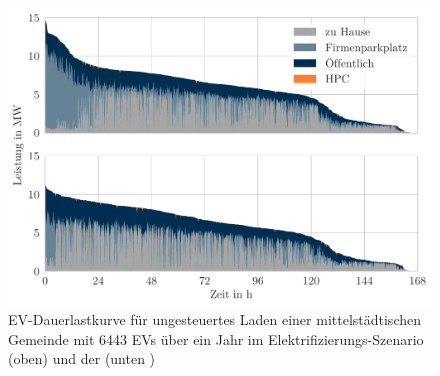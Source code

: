 \begin{figure}[H]
    \centering
    \includegraphics[width=\textwidth]{Bilder/example_load_duration_curve}
    \caption{EV-Dauerlastkurve für ungesteuertes Laden einer mittelstädtischen Gemeinde mit \num{6443} \glspl{EV} über ein Jahr im Elektrifizierungs-Szenario (oben) und der \SzeFirmenparkplatz (unten
    )}\label{fig:example_load_curve}
\end{figure}
